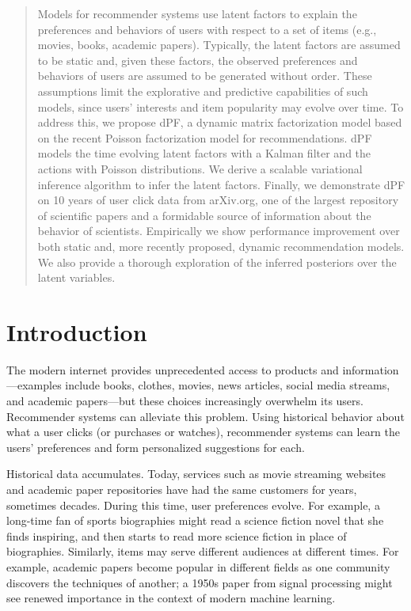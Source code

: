 \documentclass{sig-alternate}
\begin{document}
\maketitle
\begin{abstract}
Models for recommender systems use latent factors to explain the
preferences and behaviors of users with respect to a set of items (e.g.,
movies, books, academic papers). Typically, the latent factors are assumed
to be static and, given these factors, the observed preferences and
behaviors of users are assumed to be generated without order. These assumptions limit
the explorative and predictive capabilities of such models, since users'
interests and item popularity may evolve over time. To address this, we propose dPF, a dynamic
matrix factorization model based on the recent Poisson factorization model
for recommendations. dPF models the time evolving latent factors with a
Kalman filter and the actions with Poisson distributions. We
derive a scalable variational inference algorithm to infer the latent factors.
Finally, we demonstrate dPF on 10 years of user click data from arXiv.org,
one of the largest repository of scientific papers and a formidable source
of information about the behavior of scientists. Empirically we show
performance improvement over both static and, more recently proposed,
dynamic recommendation models. We also provide a thorough exploration of
the inferred posteriors over the latent variables.
\end{abstract}








\section{Introduction}

\noindent

The modern internet provides unprecedented access to products and
information---examples include books, clothes, movies, news articles,
social media streams, and academic papers---but these choices
increasingly overwhelm its users. Recommender systems can alleviate
this problem.  Using historical behavior about what a user clicks (or
purchases or watches), recommender systems can learn the users'
preferences and form personalized suggestions for each.

Historical data accumulates. Today, services such as movie streaming
websites and academic paper repositories have had the same customers
for years, sometimes decades. During this time, user preferences
evolve. For example, a long-time fan of sports biographies might read
a science fiction novel that she finds inspiring, and then starts to
read more science fiction in place of biographies.  Similarly, items
may serve different audiences at different times.  For example,
academic papers become popular in different fields as one community
discovers the techniques of another; a 1950s paper from signal
processing might see renewed importance in the context of modern
machine learning.
\end{document}
